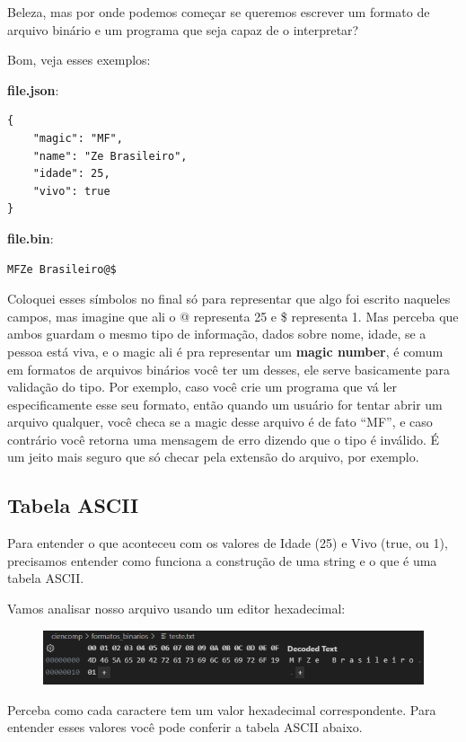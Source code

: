 \documentclass[a4paper,oneside,12pt]{article}
\begin{document}
Beleza, mas por onde podemos começar se queremos escrever um formato de arquivo binário e um programa que seja capaz de o interpretar?

Bom, veja esses exemplos:

\noindent
\textbf{file.json}:
\begin{lstlisting}
{
    "magic": "MF",
    "name": "Ze Brasileiro",
    "idade": 25,
    "vivo": true
}
\end{lstlisting}

\noindent
\textbf{file.bin}:
\begin{lstlisting}
MFZe Brasileiro@$
\end{lstlisting}

Coloquei esses símbolos no final só para representar que algo foi escrito naqueles campos, mas imagine que ali o @ representa 25 e \$ representa 1. Mas perceba que ambos guardam o mesmo tipo de informação, dados sobre nome, idade, se a pessoa está viva, e o magic ali é pra representar um \textbf{magic number}, é comum em formatos de arquivos binários você ter um desses, ele serve basicamente para validação do tipo. Por exemplo, caso você crie um programa que vá ler especificamente esse seu formato, então quando um usuário for tentar abrir um arquivo qualquer, você checa se a magic desse arquivo é de fato ``MF'', e caso contrário você retorna uma mensagem de erro dizendo que o tipo é inválido. É um jeito mais seguro que só checar pela extensão do arquivo, por exemplo.

\subsection{Tabela ASCII}

Para entender o que aconteceu com os valores de Idade (25) e Vivo (true, ou 1), precisamos entender como funciona a construção de uma string e o que é uma tabela ASCII.

Vamos analisar nosso arquivo usando um editor hexadecimal:

\begin{figure}[h]
    \centering
    \includegraphics[width=\linewidth]{media/hex.png}
\end{figure}

Perceba como cada caractere tem um valor hexadecimal correspondente. Para entender esses valores você pode conferir a tabela ASCII abaixo.
\end{document}
